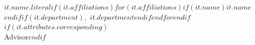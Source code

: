 $it.name.literal$$if(it.affiliations)$$for(it.affiliations)$$if(it.name)$$it.name$$endif$$if(it.department)$,~$it.department$$endif$$endfor$$endif$$if(it.attributes.corresponding)$\\Advisor$endif$\\